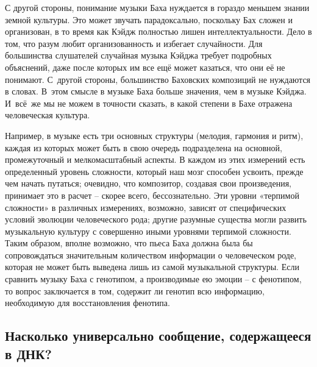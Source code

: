 \documentclass[../main.tex]{subfiles}
\begin{document}
С другой стороны, понимание музыки Баха нуждается в гораздо меньшем знании земной культуры. Это может звучать парадоксально, поскольку Бах сложен и организован, в то время как Кэйдж полностью лишен интеллектуальности. Дело в том, что разум любит организованность и избегает случайности. Для большинства слушателей случайная музыка Кэйджа требует подробных объяснений, даже после которых им все ещё может казаться, что они её не понимают. С~другой стороны, большинство Баховских композиций не нуждаются в словах. В~этом смысле в музыке Баха больше значения, чем в музыке Кэйджа. И~всё~же мы не можем в точности сказать, в какой степени в Бахе отражена человеческая культура.

Например, в музыке есть три основных структуры (мелодия, гармония и ритм), каждая из которых может быть в свою очередь подразделена на основной, промежуточный и мелкомасштабный аспекты. В каждом из этих измерений есть определенный уровень сложности, который наш мозг способен усвоить, прежде чем начать путаться; очевидно, что композитор, создавая свои произведения, принимает это в расчет \--- скорее всего, бессознательно. Эти уровни «терпимой сложности» в различных измерениях, возможно, зависят от специфических условий эволюции человеческого рода; другие разумные существа могли развить музыкальную культуру с совершенно иными уровнями терпимой сложности. Таким образом, вполне возможно, что пьеса Баха должна была бы сопровождаться значительным количеством информации о человеческом роде, которая не может быть выведена лишь из самой музыкальной структуры. Если сравнить музыку Баха с генотипом, а производимые ею эмоции \--- с фенотипом, то вопрос заключается в том, содержит ли генотип всю информацию, необходимую для восстановления фенотипа.


\subsection{Насколько универсально сообщение, содержащееся в ДНК?}
\end{document}
